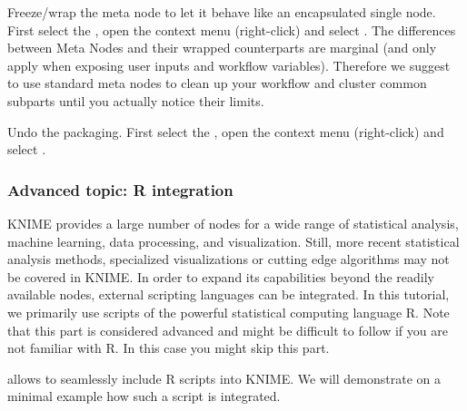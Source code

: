 \begin{task}
Freeze/wrap the meta node to let it behave like an encapsulated single node. First select the , 
open the context menu (right-click) and select . The differences between Meta Nodes and their 
wrapped counterparts are marginal (and only apply when exposing user inputs and workflow variables). Therefore we 
suggest to use standard meta nodes to clean up your workflow and cluster common subparts until you actually notice 
their limits.
\end{task}

\begin{task}
Undo the packaging. First select the , open the context menu (right-click) and select .
\end{task}

\subsubsection{Advanced topic: R integration}

KNIME provides a large number of nodes for a wide range of statistical analysis, machine learning, data processing, 
and visualization. Still, more recent statistical analysis methods, specialized visualizations or cutting edge 
algorithms may not be covered in KNIME. In order to expand its capabilities beyond the readily available nodes, 
external scripting languages can be integrated. In this tutorial, we primarily use scripts of the powerful 
statistical computing language R. Note that this part is considered advanced and might be difficult to follow if you 
are not familiar with R. In this case you might skip this part.

 allows to seamlessly include R scripts into KNIME. We will demonstrate on a minimal 
example how such a script is integrated.

